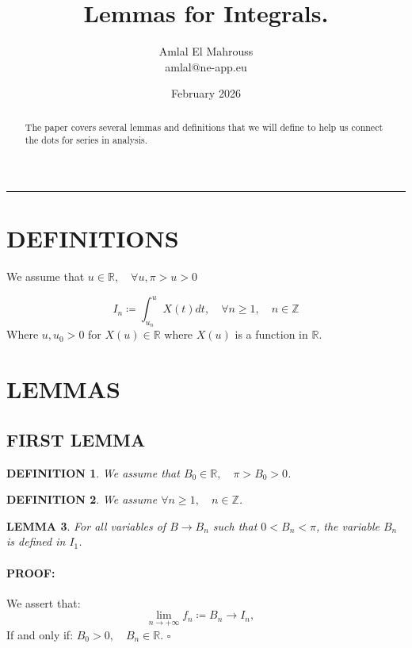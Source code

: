 \documentclass[11pt, a4paper]{article}
\title{Lemmas for Integrals.}
\author{Amlal El Mahrouss\\amlal@ne-app.eu}
\date{February 2026}
\newenvironment{proof}{\paragraph{PROOF:}}{\hfill$\square$}
\newtheorem{thm}{LEMMA}[section]
\newtheorem{defn}[thm]{DEFINITION}
\begin{document}
\maketitle

\begin{abstract}
\begin{center}
    The paper covers several lemmas and definitions that we will define to help us connect the dots for series in analysis.
\end{center}
\end{abstract}

\begin{center}
  \rule[0.01cm]{17cm}{0.01cm}
\end{center}

\section{DEFINITIONS}

We assume that $u \in \mathbb{R}, \quad \forall u, \pi > u > 0$

\begin{equation}
	I_{n} \coloneqq \int_{u_{n}}^{u} X(t) dt, \quad \forall n \geq 1, \quad n \in \mathbb{Z}
\end{equation}
Where $u, u_{0} > 0$ for $X(u) \in \mathbb{R}$ where $X(u)$ is a function in $\mathbb{R}$.

\section{LEMMAS}

\subsection{FIRST LEMMA}

\begin{defn}We assume that $B_{0} \in \mathbb{R}, \quad \pi > B_{0} > 0$. \end{defn}
\begin{defn}We assume $\forall n \geq 1, \quad n \in \mathbb{Z}$. \end{defn}
\begin{thm}For all variables of $B \to B_{n}$ such that $0 < B_{n} < \pi$, the variable $B_{n}$ is defined in $I_{1}$.\end{thm}

\begin{proof}
We assert that:
\begin{equation}
    \lim_{n \to +\infty} f_{n} \coloneqq B_{n} \to I_{n}, \quad
\end{equation}
If and only if: $B_{0} > 0, \quad B_{n} \in \mathbb{R}$.
\end{proof}
\end{document}

